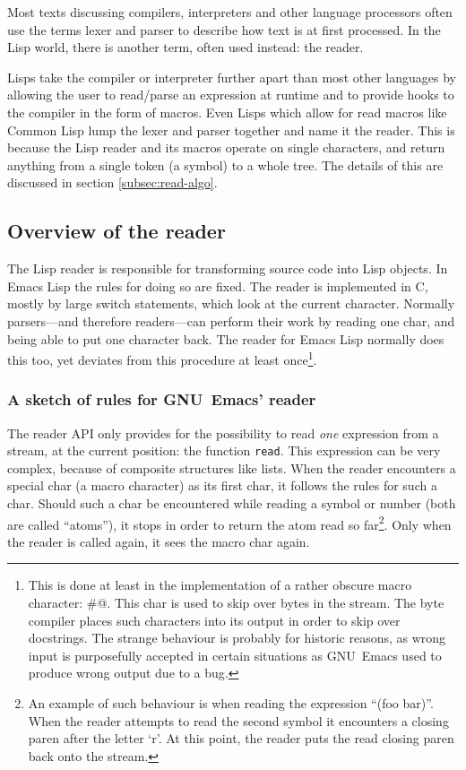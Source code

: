 \documentclass[a4paper,10pt,twoside]{article}
\newcommand{\el}{Emacs Lisp}
\newcommand{\cl}{Common Lisp}
\newcommand{\fun}[1]{\texttt{#1}}
\newcommand{\emacs}{GNU~Emacs}
\newcommand{\Read}{\fun{read}}
\begin{document}
Most texts discussing compilers, interpreters and other language processors
often use the terms lexer and parser to describe how text is at first processed.
In the Lisp world, there is another term, often used instead: the reader.

Lisps take the compiler or interpreter further apart than most other languages
by allowing the user to read/parse an expression at runtime and to provide hooks
to the compiler in the form of macros.  Even Lisps which allow for read macros
like \cl{} lump the lexer and parser together and name it the reader.  This is
because the Lisp reader and its macros operate on single characters, and return
anything from a single token (a symbol) to a whole tree.  The details of this
are discussed in section \ref{subsec:read-algo}.

\subsection{Overview of the reader}
\label{subsec:reader}

The Lisp reader is responsible for transforming source code into Lisp objects.
In \el{} the rules for doing so are fixed.  The reader is implemented in C,
mostly by large switch statements, which look at the current character.
Normally parsers---and therefore readers---can perform their work by reading one
char, and being able to put one character back.  The reader for \el{} normally
does this too, yet deviates from this procedure at least once\footnote{This is
  done at least in the implementation of a rather obscure macro character: \#@.
  This char is used to skip over bytes in the stream.  The byte compiler places
  such characters into its output in order to skip over docstrings.  The strange
  behaviour is probably for historic reasons, as wrong input is purposefully
  accepted in certain situations as \emacs{} used to produce wrong output due to
  a bug.}.

\subsubsection{A sketch of rules for \emacs’ reader}
\label{subsubsec:rules-sketch}

The reader API only provides for the possibility to read \emph{one} expression
from a stream, at the current position: the function \Read{}.  This
expression can be very complex, because of composite structures like lists.
When the reader encounters a special char (a macro character) as its first char,
it follows the rules for such a char.  Should such a char be encountered while
reading a symbol or number (both are called ``atoms''), it stops in order to
return the atom read so far\footnote{An example of such behaviour is when
  reading the expression ``(foo bar)''.  When the reader attempts to read the
  second symbol it encounters a closing paren after the letter `r'.  At this
  point, the reader puts the read closing paren back onto the stream.}.  Only
when the reader is called again, it sees the macro char again.
\end{document}
